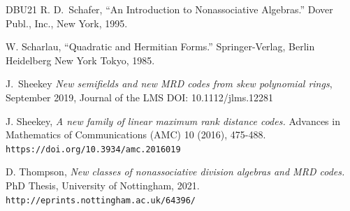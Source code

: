 \documentclass[12pt]{amsart}
\theoremstyle{plain}
\theoremstyle{definition}
\numberwithin{equation}{section}
\numberwithin{figure}{section}
\begin{document}
\begin{thebibliography}{DBU{\etalchar{+}}21}
 R. D.~Schafer, ``An Introduction to Nonassociative Algebras.'' Dover Publ., Inc., New York, 1995.

 W. Scharlau, ``Quadratic and Hermitian Forms.'' Springer-Verlag, Berlin Heidelberg New York
Tokyo, 1985.


  J.~Sheekey
\emph{New semifields and new MRD codes from skew polynomial rings}, September 2019, Journal of the LMS
DOI: 10.1112/jlms.12281

 J. Sheekey, \emph{A new family of linear maximum rank distance codes.} Advances in Mathematics of Communications (AMC) 10 (2016), 475-488.
     \verb#https://doi.org/10.3934/amc.2016019#

 D. Thompson, \emph{New classes of nonassociative division algebras and MRD codes.} PhD Thesis, University of Nottingham, 2021.
\verb#http://eprints.nottingham.ac.uk/64396/#


\end{thebibliography}
\end{document}
